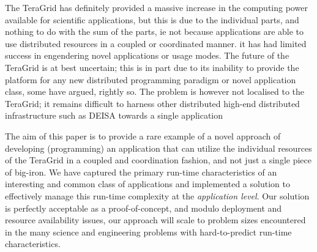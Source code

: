 \documentclass[conference,final]{IEEEtran}
\begin{document}

The TeraGrid has definitely provided a massive increase in the
computing power available for scientific applications, but this is due
to the individual parts, and nothing to do with the sum of the parts,
ie not because applications are able to use distributed resources in a
coupled or coordinated manner.  it has had limited success in
engendering novel applications or usage modes.  The future of the
TeraGrid \cite{teragridfuture} is at best uncertain; this is in part
due to its inability to provide the platform for any new distributed
programming paradigm or novel application class, some have argued,
rightly so.  The problem is however not localised to the TeraGrid; it
remains difficult to harness other distributed high-end distributed
infrastructure such as DEISA towards a single application

The aim of this paper is to provide a rare example of a novel approach
of developing (programming) an application that can utilize the
individual resources of the TeraGrid in a coupled and coordination
fashion, and not just a single piece of big-iron.  We have captured
the primary run-time characteristics of an interesting and common
class of applications and implemented a solution to effectively manage
this run-time complexity at the {\it application level}.  Our solution
is perfectly acceptable as a proof-of-concept, and modulo deployment
and resource availability issues, our approach will scale to problem
sizes encountered in the many science and engineering problems with
hard-to-predict run-time characteristics.

% 




\end{document}
